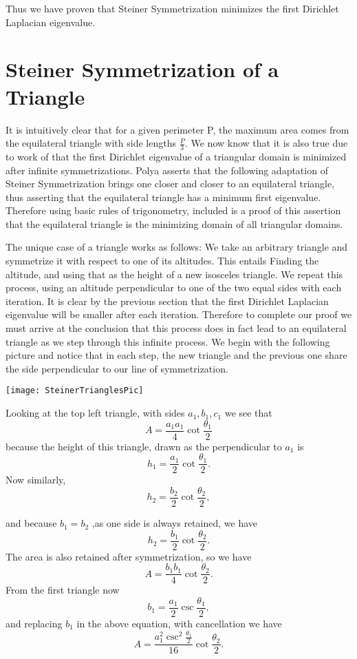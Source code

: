 \documentclass[12pt]{report}
\numberwithin{definition}{section}
\begin{document}
Thus we have proven that Steiner Symmetrization minimizes the first Dirichlet Laplacian eigenvalue. 

\break
\section {Steiner Symmetrization of a Triangle}

	    \hspace{4mm}It is intuitively clear that for a given perimeter P, the maximum area comes from the equilateral triangle with side lengths $\frac{P}{3}$. We now know that it is also true due to work of \cite{Polya} that the first Dirichlet eigenvalue of a triangular domain is minimized after infinite symmetrizations.   Polya asserts that the following adaptation of Steiner Symmetrization brings one closer and closer to an equilateral triangle, thus asserting that the equilateral triangle has a minimum first eigenvalue. Therefore using basic rules of trigonometry, included is a proof of this assertion that the equilateral triangle is the minimizing domain of all triangular domains.
	
    The unique case of a triangle works as follows: We take an arbitrary triangle and symmetrize it with respect to one of its altitudes. This entails Finding the altitude, and using that as the height of a new isosceles triangle. We repeat this process, using an altitude perpendicular to one of the two equal sides with each iteration. It is clear by the previous section that the first Dirichlet Laplacian eigenvalue will be smaller after each iteration. Therefore to complete our proof we must arrive at the conclusion that this process does in fact lead to an equilateral triangle as we step through this infinite process. We begin with the following picture and notice that in each step, the new triangle and the previous one share the side perpendicular to our line of symmetrization. 

	
	\texttt{[image: SteinerTrianglesPic]}
	


Looking at the top left triangle, with sides $a_1, b_1, c_1$ we see that 
\[
A = \frac{a_1a_1}{4}\cot{\frac{\theta_1}{2}}
\]
because the height of this triangle, drawn as the perpendicular to $a_1$ is 
\[
h_1 = \frac{a_1}{2}\cot{\frac{\theta_1}{2}}.
\] 
Now similarly, 
\[
h_2 = \frac{b_2}{2}\cot{\frac{\theta_2}{2}} ,
\]

and because $b_1 = b_2$ ,as one side is always retained,
we have 
\[
h_2 = \frac{b_1}{2}\cot{\frac{\theta_2}{2}}.
\]
The area is also retained after symmetrization, so we have 
\[
A = \frac{b_1b_1}{4}\cot{\frac{\theta_2}{2}}.
\]
From the first triangle now 
\[
b_1 = \frac{a_1}{2}\csc{\frac{\theta_1}{2}},
\]
and replacing $b_1$ in the above equation, with cancellation we have 
\[
A = \frac{a_1^2\csc^2{ \frac{\theta_1}{2}}}{16}\cot{\frac{\theta_2}{2}}.
\]
\end{document}
